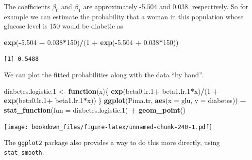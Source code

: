 \documentclass[
]{krantz}
\makeatletter
\newenvironment{Shaded}{\begin{snugshade}}{\end{snugshade}}
\newcommand{\ControlFlowTok}[1]{\textcolor[rgb]{0.27,0.27,0.27}{\textbf{#1}}}
\newcommand{\DataTypeTok}[1]{\textcolor[rgb]{0.27,0.27,0.27}{#1}}
\newcommand{\DecValTok}[1]{\textcolor[rgb]{0.06,0.06,0.06}{#1}}
\newcommand{\FloatTok}[1]{\textcolor[rgb]{0.06,0.06,0.06}{#1}}
\newcommand{\KeywordTok}[1]{\textcolor[rgb]{0.27,0.27,0.27}{\textbf{#1}}}
\newcommand{\NormalTok}[1]{#1}
\newcommand{\OperatorTok}[1]{\textcolor[rgb]{0.43,0.43,0.43}{\textbf{#1}}}
\newcommand{\StringTok}[1]{\textcolor[rgb]{0.5,0.5,0.5}{#1}}
\newenvironment{kframe}{%
\medskip{}
\setlength{\fboxsep}{.8em}
 \def\at@end@of@kframe{}%
 \ifinner\ifhmode%
  \def\at@end@of@kframe{\end{minipage}}%
  \begin{minipage}{\columnwidth}%
 \fi\fi%
 \def\FrameCommand##1{\hskip\@totalleftmargin \hskip-\fboxsep
 \colorbox{shadecolor}{##1}\hskip-\fboxsep
     \hskip-\linewidth \hskip-\@totalleftmargin \hskip\columnwidth}%
 \MakeFramed {\advance\hsize-\width
   \@totalleftmargin\z@ \linewidth\hsize
   \@setminipage}}%
 {\par\unskip\endMakeFramed%
 \at@end@of@kframe}
\renewenvironment{Shaded}{\begin{kframe}}{\end{kframe}}
\makeatother
\begin{document}
The coefficients \(\beta_0\) and \(\beta_1\) are approximately -5.504 and
0.038, respectively. So for example we can estimate the probability that a woman in this population whose glucose level is 150 would be diabetic as

\begin{Shaded}
\begin{Highlighting}[]
\KeywordTok{exp}\NormalTok{(}\OperatorTok{{-}}\FloatTok{5.504} \OperatorTok{+}\StringTok{ }\FloatTok{0.038}\OperatorTok{*}\DecValTok{150}\NormalTok{)}\OperatorTok{/}\NormalTok{(}\DecValTok{1} \OperatorTok{+}\StringTok{ }\KeywordTok{exp}\NormalTok{(}\OperatorTok{{-}}\FloatTok{5.504} \OperatorTok{+}\StringTok{ }\FloatTok{0.038}\OperatorTok{*}\DecValTok{150}\NormalTok{))}
\end{Highlighting}
\end{Shaded}

\begin{verbatim}
[1] 0.5488
\end{verbatim}

We can plot the fitted probabilities along with the data ``by hand''.

\begin{Shaded}
\begin{Highlighting}[]
\NormalTok{diabetes.logistic}\FloatTok{.1}\NormalTok{ \textless{}{-}}\StringTok{ }\ControlFlowTok{function}\NormalTok{(x)\{}
  \KeywordTok{exp}\NormalTok{(beta0.lr}\FloatTok{.1}\OperatorTok{+}\StringTok{ }\NormalTok{beta1.lr}\FloatTok{.1}\OperatorTok{*}\NormalTok{x)}\OperatorTok{/}\NormalTok{(}\DecValTok{1} \OperatorTok{+}\StringTok{ }\KeywordTok{exp}\NormalTok{(beta0.lr}\FloatTok{.1}\OperatorTok{+}\StringTok{ }
\StringTok{                                           }\NormalTok{beta1.lr}\FloatTok{.1}\OperatorTok{*}\NormalTok{x))}
\NormalTok{\}}
\KeywordTok{ggplot}\NormalTok{(Pima.tr, }\KeywordTok{aes}\NormalTok{(}\DataTypeTok{x =}\NormalTok{ glu, }\DataTypeTok{y =}\NormalTok{ diabetes)) }\OperatorTok{+}\StringTok{ }
\StringTok{  }\KeywordTok{stat\_function}\NormalTok{(}\DataTypeTok{fun =}\NormalTok{ diabetes.logistic}\FloatTok{.1}\NormalTok{) }\OperatorTok{+}\StringTok{ }\KeywordTok{geom\_point}\NormalTok{()}
\end{Highlighting}
\end{Shaded}

\texttt{[image: bookdown\_files/figure-latex/unnamed-chunk-240-1.pdf]}

The \texttt{ggplot2} package also provides a way to do this more directly, using \texttt{stat\_smooth}.
\end{document}
